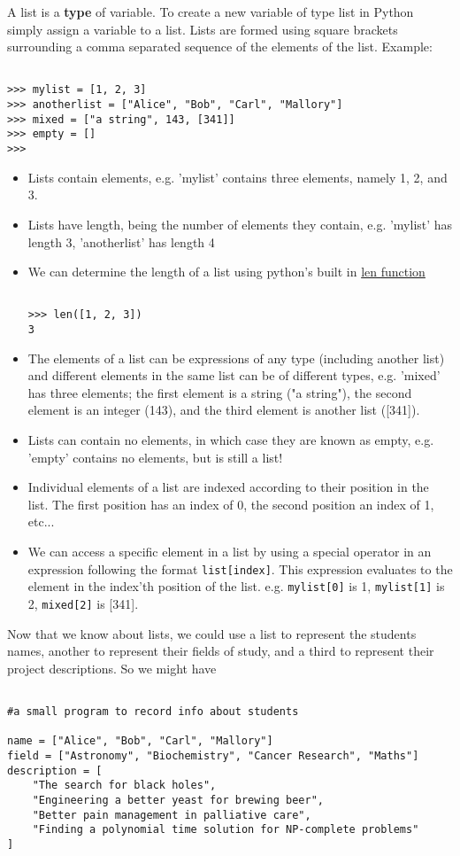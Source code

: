 A list is a \textbf{type} of variable. To create a new   variable of type list in Python simply assign a variable to a list.   Lists are formed using square brackets surrounding a comma separated   sequence of the elements of the list.  Example:
\begin{lstlisting}

>>> mylist = [1, 2, 3]
>>> anotherlist = ["Alice", "Bob", "Carl", "Mallory"]
>>> mixed = ["a string", 143, [341]]
>>> empty = []
>>>
\end{lstlisting}
\begin{itemize}
	\item Lists contain elements, e.g. 'mylist' contains three elements,    namely 1, 2, and 3.
	\item Lists have length, being the number of elements they contain,    e.g. 'mylist' has length 3, 'anotherlist' has length 4
	\item We can determine the length of a list using python's built in    \href{http://olympiad.cs.uct.ac.za/docs/python-docs-2.6/library/functions.html#len}{len    function}
\begin{lstlisting}

>>> len([1, 2, 3])
3
\end{lstlisting}
	\item The elements of a list can be expressions of any type    (including another list) and different elements in the same list    can be of different types, e.g. 'mixed' has three elements; the    first element is a string ("a string"), the second element is an    integer (143), and the third element is another list ([341]).
	\item Lists can contain no elements, in which case they are known as    empty, e.g. 'empty' contains no elements, but is still a list!
	\item Individual elements of a list are indexed according to their    position in the list. The first position has an index of 0, the    second position an index of 1, etc...
	\item We can access a specific element in a list by using a special    operator in an expression following the format    
\texttt{list[index]}. This expression evaluates to the element    in the index'th position of the list. e.g. 
\texttt{mylist[0]}    is 1, 
\texttt{mylist[1]} is 2, 
\texttt{mixed[2]} is    [341].
\end{itemize}

Now that we know about lists, we could use a list to represent the   students names, another to represent their fields of study, and a third   to represent their project descriptions. So we might have
\begin{lstlisting}

#a small program to record info about students

name = ["Alice", "Bob", "Carl", "Mallory"]
field = ["Astronomy", "Biochemistry", "Cancer Research", "Maths"]
description = [
    "The search for black holes",
    "Engineering a better yeast for brewing beer",
    "Better pain management in palliative care",
    "Finding a polynomial time solution for NP-complete problems"
]
\end{lstlisting}

